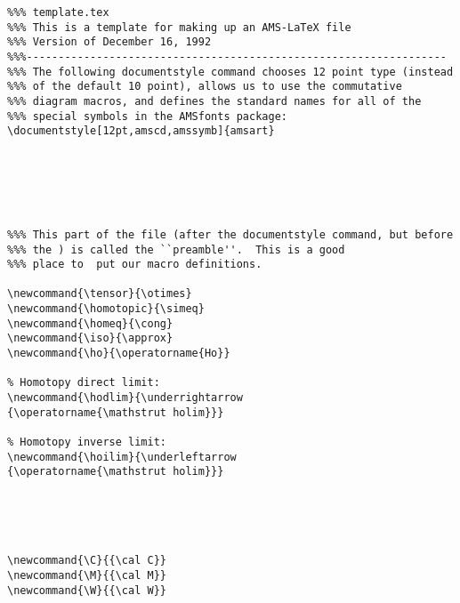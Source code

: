 \begin{verbatim}
%%% template.tex
%%% This is a template for making up an AMS-LaTeX file
%%% Version of December 16, 1992
%%%------------------------------------------------------------------
%%% The following documentstyle command chooses 12 point type (instead
%%% of the default 10 point), allows us to use the commutative
%%% diagram macros, and defines the standard names for all of the
%%% special symbols in the AMSfonts package:
\documentstyle[12pt,amscd,amssymb]{amsart}






%%% This part of the file (after the documentstyle command, but before
%%% the ) is called the ``preamble''.  This is a good
%%% place to  put our macro definitions.

\newcommand{\tensor}{\otimes}
\newcommand{\homotopic}{\simeq}
\newcommand{\homeq}{\cong}
\newcommand{\iso}{\approx}
\newcommand{\ho}{\operatorname{Ho}}

% Homotopy direct limit:
\newcommand{\hodlim}{\underrightarrow
{\operatorname{\mathstrut holim}}}

% Homotopy inverse limit:
\newcommand{\hoilim}{\underleftarrow
{\operatorname{\mathstrut holim}}}





\newcommand{\C}{{\cal C}}
\newcommand{\M}{{\cal M}}
\newcommand{\W}{{\cal W}}




\end{verbatim}
